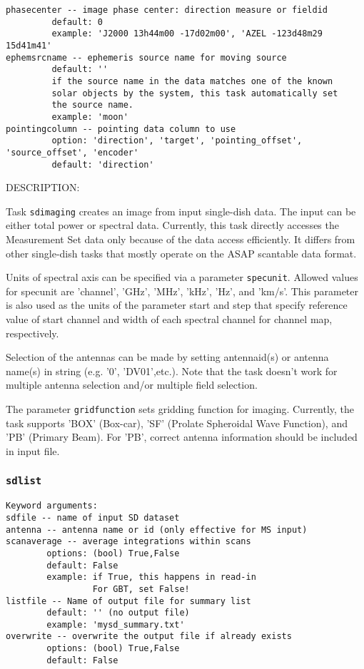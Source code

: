 \begin{verbatim}
phasecenter -- image phase center: direction measure or fieldid 
         default: 0
         example: 'J2000 13h44m00 -17d02m00', 'AZEL -123d48m29 15d41m41'
ephemsrcname -- ephemeris source name for moving source
         default: ''
         if the source name in the data matches one of the known 
         solar objects by the system, this task automatically set 
         the source name. 
         example: 'moon' 
pointingcolumn -- pointing data column to use
         option: 'direction', 'target', 'pointing_offset', 'source_offset', 'encoder' 
         default: 'direction'
\end{verbatim}

        DESCRIPTION:

        Task {\tt sdimaging} creates an image from input single-dish data.
        The input can be either total power or spectral data. Currently,
        this task directly accesses the Measurement Set data only because of 
        the data access efficiently. It differs from other single-dish tasks 
        that mostly operate on the ASAP scantable data format.
 
        Units of spectral axis can be specified via a parameter {\tt specunit}.
        Allowed values for specunit are 'channel', 'GHz', 'MHz', 'kHz', 'Hz', 
        and 'km/s'. This parameter is also used as the units of the parameter 
        start and step that specify reference value of start channel and width 
        of each spectral channel for channel map, respectively.

        Selection of the antennas can be made by setting antennaid(s) or 
        antenna name(s) in string (e.g. '0', 'DV01',etc.). Note that the task 
        doesn't work for multiple antenna selection and/or multiple field 
        selection. 

        The parameter {\tt gridfunction} sets gridding function for imaging. 
        Currently, the task supports 'BOX' (Box-car), 'SF' (Prolate Spheroidal 
        Wave Function), and 'PB' (Primary Beam). For 'PB', correct antenna 
        information should be included in input file. 


\subsubsection{{\tt sdlist}}
\label{section:sd.sdtasks.tasks.sdlist}

\begin{verbatim}
Keyword arguments:
sdfile -- name of input SD dataset
antenna -- antenna name or id (only effective for MS input)
scanaverage -- average integrations within scans
        options: (bool) True,False
        default: False
        example: if True, this happens in read-in
                 For GBT, set False!
listfile -- Name of output file for summary list
        default: '' (no output file)
        example: 'mysd_summary.txt'
overwrite -- overwrite the output file if already exists
        options: (bool) True,False
        default: False
\end{verbatim}
    
